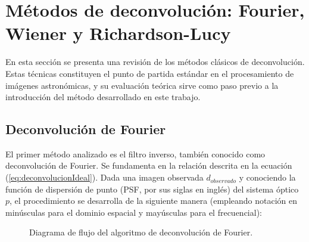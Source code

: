 
\section{Métodos de deconvolución: Fourier, Wiener y Richardson-Lucy} \label{sec:metodosDeconvolucion}

En esta sección se presenta una revisión de los métodos clásicos de deconvolución. Estas técnicas constituyen el punto de partida estándar en el procesamiento de imágenes astronómicas, y su evaluación teórica sirve como paso previo a la introducción del método desarrollado en este trabajo.

\subsection{Deconvolución de Fourier}
El primer método analizado es el filtro inverso, también conocido como deconvolución de Fourier. Se fundamenta en la relación descrita en la ecuación (\ref{eq:deconvolucionIdeal}). Dada una imagen observada $d_{observado}$ y conociendo la función de dispersión de punto (PSF, por sus siglas en inglés) del sistema óptico $p$, el procedimiento se desarrolla de la siguiente manera (empleando notación en minúsculas para el dominio espacial y mayúsculas para el frecuencial):

\begin{figure}[H]
    \centering
    \caption{Diagrama de flujo del algoritmo de deconvolución de Fourier.}
    \label{fig:flowchart_fourier}
\end{figure}

